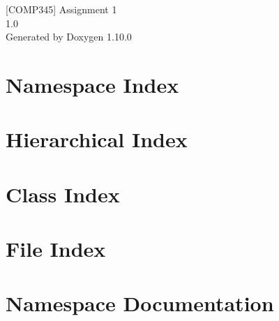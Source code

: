 \documentclass[twoside]{book}
\newcommand{\+}{\discretionary{\mbox{\scriptsize$\hookleftarrow$}}{}{}}
\newcommand{\clearemptydoublepage}{%
    \newpage{\pagestyle{empty}\cleardoublepage}%
  }
\begin{document}
  \raggedbottom
    \hypersetup{pageanchor=false,
                bookmarksnumbered=true,
                pdfencoding=unicode
               }
  \begin{titlepage}
  \vspace*{7cm}
  \begin{center}%
  {\Large \mbox{[}\+COMP345\mbox{]} Assignment 1}\\
  [1ex]\large 1.\+0 \\
  \vspace*{1cm}
  {\large Generated by Doxygen 1.10.0}\\
  \end{center}
  \end{titlepage}
  \clearemptydoublepage
  \tableofcontents
  \clearemptydoublepage
  \hypersetup{pageanchor=true}
\chapter{Namespace Index}

\chapter{Hierarchical Index}

\chapter{Class Index}

\chapter{File Index}

\chapter{Namespace Documentation}




















\end{document}
